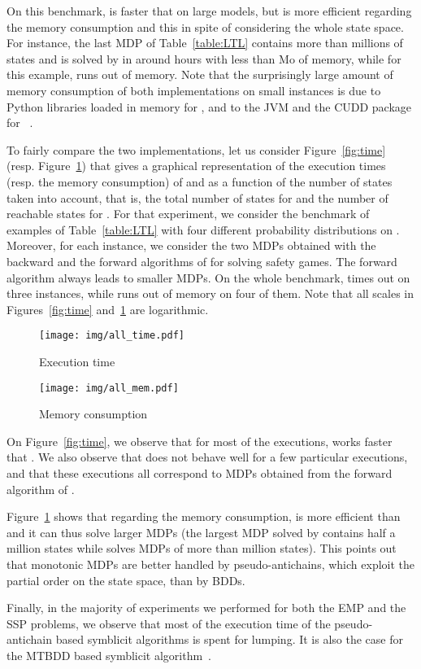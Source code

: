 On this benchmark,  is faster that  on large models, but  is more efficient regarding the memory consumption and this in spite of considering the whole state space. For instance, the last MDP of Table~\ref{table:LTL} contains more than  millions of states and is solved by  in around  hours with less than Mo of memory, while for this example,  runs out of memory. Note that the surprisingly large amount of memory consumption of both implementations on small instances is due to Python libraries loaded in memory for , and to the JVM and the CUDD package for ~\cite{DBLP:conf/hvc/JansenKOSZ07}.

To fairly compare the two implementations, let us consider Figure~\ref{fig:time} (resp. Figure~\ref{fig:memory}) that gives a graphical representation of the execution times (resp.  the memory consumption) of  and  as a function of the number of states taken into account, that is, the total number of states for  and the number of reachable states for . For that experiment, we consider the benchmark of examples of Table~\ref{table:LTL} with four different probability distributions on . Moreover, for each instance, we consider the two MDPs obtained with the backward and the forward algorithms of  for solving safety games. The forward algorithm always leads to smaller MDPs. On the whole benchmark,  times out on three instances, while  runs out of memory on four of them. Note that all scales in Figures~\ref{fig:time} and~\ref{fig:memory} are logarithmic.


\begin{figure}[!h]
   \begin{minipage}[t]{.48\linewidth}
	\texttt{[image: img/all\_time.pdf]}
	\caption{Execution time}
	\label{fig:time}   
\end{minipage} \hfill
   \begin{minipage}[t]{.48\linewidth}
	\texttt{[image: img/all\_mem.pdf]}
	\caption{Memory consumption}
	\label{fig:memory}  
 \end{minipage}
\end{figure}

On Figure~\ref{fig:time}, we observe that for most of the executions,  works faster that . We also observe that   does not behave well for a few particular executions, and that these executions all correspond to MDPs obtained from the forward algorithm of .

Figure~\ref{fig:memory} shows that regarding the memory consumption,  is  more efficient than  and it can thus solve larger MDPs (the largest MDP solved by  contains half a million states while  solves MDPs of more than  million states). This points out that monotonic MDPs are better handled by pseudo-antichains, which exploit the partial order on the state space, than by BDDs.

\medskip
Finally, in the majority of experiments we performed for both the EMP and the SSP problems, we observe that most of the execution time of the pseudo-antichain based symblicit algorithms is spent for lumping. It is also the case for the MTBDD based symblicit algorithm~\cite{DBLP:conf/qest/WimmerBBHCHDT10}.
